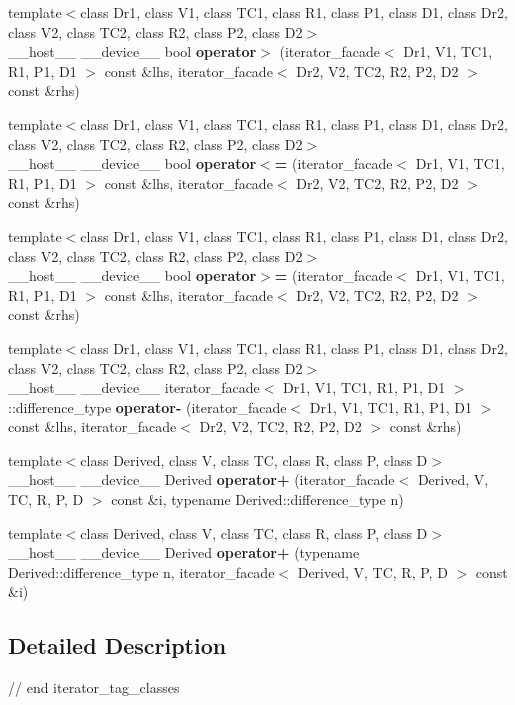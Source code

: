 \begin{CompactItemize}
\item 
{\footnotesize template$<$class Dr1, class V1, class TC1, class R1, class P1, class D1, class Dr2, class V2, class TC2, class R2, class P2, class D2$>$ }\\\_\-\_\-host\_\-\_\- \_\-\_\-device\_\-\_\- bool \textbf{operator$>$} (iterator\_\-facade$<$ Dr1, V1, TC1, R1, P1, D1 $>$ const \&lhs, iterator\_\-facade$<$ Dr2, V2, TC2, R2, P2, D2 $>$ const \&rhs)\label{namespacekomrade_1_1experimental_ae4c33d5f71f583df2e11d971f3fee37}

\item 
{\footnotesize template$<$class Dr1, class V1, class TC1, class R1, class P1, class D1, class Dr2, class V2, class TC2, class R2, class P2, class D2$>$ }\\\_\-\_\-host\_\-\_\- \_\-\_\-device\_\-\_\- bool \textbf{operator$<$=} (iterator\_\-facade$<$ Dr1, V1, TC1, R1, P1, D1 $>$ const \&lhs, iterator\_\-facade$<$ Dr2, V2, TC2, R2, P2, D2 $>$ const \&rhs)\label{namespacekomrade_1_1experimental_4869164f1cce67d46990a08f59529c31}

\item 
{\footnotesize template$<$class Dr1, class V1, class TC1, class R1, class P1, class D1, class Dr2, class V2, class TC2, class R2, class P2, class D2$>$ }\\\_\-\_\-host\_\-\_\- \_\-\_\-device\_\-\_\- bool \textbf{operator$>$=} (iterator\_\-facade$<$ Dr1, V1, TC1, R1, P1, D1 $>$ const \&lhs, iterator\_\-facade$<$ Dr2, V2, TC2, R2, P2, D2 $>$ const \&rhs)\label{namespacekomrade_1_1experimental_6c56473e48975474e0dcc916baebb698}

\item 
{\footnotesize template$<$class Dr1, class V1, class TC1, class R1, class P1, class D1, class Dr2, class V2, class TC2, class R2, class P2, class D2$>$ }\\\_\-\_\-host\_\-\_\- \_\-\_\-device\_\-\_\- iterator\_\-facade$<$ Dr1, V1, TC1, R1, P1, D1 $>$::difference\_\-type \textbf{operator-} (iterator\_\-facade$<$ Dr1, V1, TC1, R1, P1, D1 $>$ const \&lhs, iterator\_\-facade$<$ Dr2, V2, TC2, R2, P2, D2 $>$ const \&rhs)\label{namespacekomrade_1_1experimental_08035ee15fceef58d27bb12d82219dc1}

\item 
{\footnotesize template$<$class Derived, class V, class TC, class R, class P, class D$>$ }\\\_\-\_\-host\_\-\_\- \_\-\_\-device\_\-\_\- Derived \textbf{operator+} (iterator\_\-facade$<$ Derived, V, TC, R, P, D $>$ const \&i, typename Derived::difference\_\-type n)\label{namespacekomrade_1_1experimental_53377102bc2bae7e50f4ed68d0f30ef2}

\item 
{\footnotesize template$<$class Derived, class V, class TC, class R, class P, class D$>$ }\\\_\-\_\-host\_\-\_\- \_\-\_\-device\_\-\_\- Derived \textbf{operator+} (typename Derived::difference\_\-type n, iterator\_\-facade$<$ Derived, V, TC, R, P, D $>$ const \&i)\label{namespacekomrade_1_1experimental_b8515494d7e4d8984d2ba4e8af3fedfd}

\end{CompactItemize}


\subsection{Detailed Description}
// end iterator\_\-tag\_\-classes 